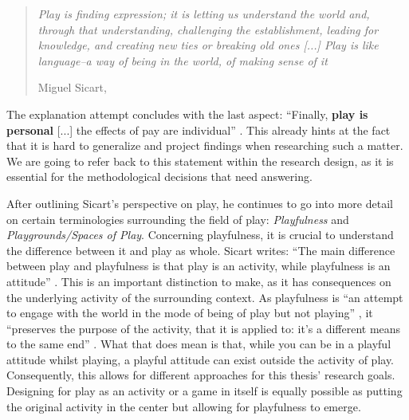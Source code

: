 \begin{quote}
  \textit{Play is finding expression; it is letting us understand the world and, through  that understanding, challenging the establishment, leading for knowledge, and creating new ties or breaking old ones [...] Play is like language--a way of being in the world, of making sense of it}

  \footnotesize{Miguel Sicart, \cite[p. 18]{sicart2014play}}
\end{quote}

The explanation attempt concludes with the last aspect: \enquote{Finally, \textbf{play is personal} [...] the effects of pay are individual} \cite[p. 17]{sicart2014play}. This already hints at the fact that it is hard to generalize and project findings when researching such a matter. We are going to refer back to this statement within the research design, as it is essential for the methodological decisions that need answering.

After outlining Sicart's perspective on play, he continues to go into more detail on certain terminologies surrounding the field of play: \textit{Playfulness} and \textit{Playgrounds/Spaces of Play}. Concerning playfulness, it is crucial to understand the difference between it and play as whole. Sicart writes: \enquote{The main difference between play and playfulness is that play is an activity, while playfulness is an attitude} \cite[p. 22]{sicart2014play}. This is an important distinction to make, as it has consequences on the underlying activity of the surrounding context. As playfulness is \enquote{an attempt to engage with the world in the mode of being of play but not playing} \cite[p. 22]{sicart2014play}, it \enquote{preserves the purpose of the activity, that it is applied to: it's a different means to the same end} \cite[p. 26]{sicart2014play}. What that does mean is that, while you can be in a playful attitude whilst playing, a playful attitude can exist outside the activity of play. Consequently, this allows for different approaches for this thesis' research goals. Designing for play as an activity or a game in itself is equally possible as putting the original activity in the center but allowing for playfulness to emerge.

